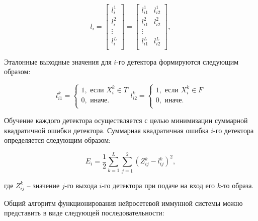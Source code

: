 \documentclass[bachelor, och, referat]{template}
\begin{document}
\begin{equation}
    l_i =
    \begin{bmatrix}
        l_i^1 \\
        l_i^2 \\
        \vdots \\
        l_i^L \\
    \end{bmatrix}
    =
    \begin{bmatrix}
        l_{i1}^1 & l_{i2}^1 \\
        l_{i1}^2 & l_{i2}^2 \\
        \vdots \\
        l_{i1}^L & l_{i2}^L \\    
    \end{bmatrix},
    \label{eq3}
\end{equation}


Эталонные выходные значения для $i$-го детектора формируются сле­дующим образом:

\begin{equation}
    l_{i1}^k = 
    \begin{cases}
        1, \text{ если } X_i^k \in T \\
        0, \text{ иначе.} \\
    \end{cases}
    l_{i2}^k = 
    \begin{cases}
        1, \text{ если } X_i^k \in F \\
        0, \text{ иначе.} \\
    \end{cases}
    \label{eq4}
\end{equation}

Обучение каждого детектора осуществляется с целью минимизации
суммарной квадратичной ошибки детектора. Суммарная квадратичная
ошибка $i$-го детектора определяется следующим образом:

\begin{equation}
    E_i = \frac{1}{2}  \sum_{k = 1}^{L} \sum_{j = 1}^{2} (Z_{ij}^k - l_{ij}^k)^2,
    \label{eq5}
\end{equation}

где $Z_{ij}^k$ -- значение $j$-го выхода $i$-го детектора при подаче на вход его $k$-то
образа.

Общий алгоритм функционирования нейросетевой иммунной системы можно представить в виде следующей последовательности:
\end{document}
